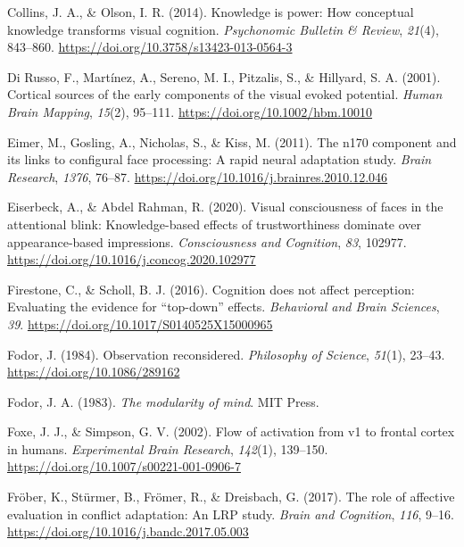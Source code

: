 \documentclass[
  english,
  man,11pt,floatsintext]{apa7}
\begin{document}
\leavevmode\hypertarget{ref-collins2014}{}%
Collins, J. A., \& Olson, I. R. (2014). Knowledge is power: How conceptual knowledge transforms visual cognition. \emph{Psychonomic Bulletin \& Review}, \emph{21}(4), 843--860. \url{https://doi.org/10.3758/s13423-013-0564-3}

\leavevmode\hypertarget{ref-dirusso2001}{}%
Di Russo, F., Martínez, A., Sereno, M. I., Pitzalis, S., \& Hillyard, S. A. (2001). Cortical sources of the early components of the visual evoked potential. \emph{Human Brain Mapping}, \emph{15}(2), 95--111. \url{https://doi.org/10.1002/hbm.10010}

\leavevmode\hypertarget{ref-eimer2011}{}%
Eimer, M., Gosling, A., Nicholas, S., \& Kiss, M. (2011). The n170 component and its links to configural face processing: A rapid neural adaptation study. \emph{Brain Research}, \emph{1376}, 76--87. \url{https://doi.org/10.1016/j.brainres.2010.12.046}

\leavevmode\hypertarget{ref-eiserbeck2020}{}%
Eiserbeck, A., \& Abdel Rahman, R. (2020). Visual consciousness of faces in the attentional blink: Knowledge-based effects of trustworthiness dominate over appearance-based impressions. \emph{Consciousness and Cognition}, \emph{83}, 102977. \url{https://doi.org/10.1016/j.concog.2020.102977}

\leavevmode\hypertarget{ref-firestone2016}{}%
Firestone, C., \& Scholl, B. J. (2016). Cognition does not affect perception: Evaluating the evidence for ``top-down'' effects. \emph{Behavioral and Brain Sciences}, \emph{39}. \url{https://doi.org/10.1017/S0140525X15000965}

\leavevmode\hypertarget{ref-fodor1984}{}%
Fodor, J. (1984). Observation reconsidered. \emph{Philosophy of Science}, \emph{51}(1), 23--43. \url{https://doi.org/10.1086/289162}

\leavevmode\hypertarget{ref-fodor1983}{}%
Fodor, J. A. (1983). \emph{The modularity of mind}. MIT Press.

\leavevmode\hypertarget{ref-foxe2002}{}%
Foxe, J. J., \& Simpson, G. V. (2002). Flow of activation from v1 to frontal cortex in humans. \emph{Experimental Brain Research}, \emph{142}(1), 139--150. \url{https://doi.org/10.1007/s00221-001-0906-7}

\leavevmode\hypertarget{ref-fruxf6ber2017}{}%
Fröber, K., Stürmer, B., Frömer, R., \& Dreisbach, G. (2017). The role of affective evaluation in conflict adaptation: An LRP study. \emph{Brain and Cognition}, \emph{116}, 9--16. \url{https://doi.org/10.1016/j.bandc.2017.05.003}
\end{document}
